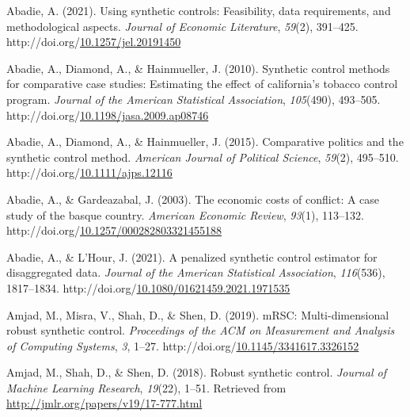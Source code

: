 \documentclass[12pt,nobind, a4paper]{reedthesis}
\newlength{\cslhangindent}
\newenvironment{CSLReferences}[2] %
{%
	\setlength{\parindent}{0pt}
	\ifodd #1 \everypar{\setlength{\hangindent}{\cslhangindent}}\ignorespaces\fi
	\ifnum #2 > 0
	\setlength{\parskip}{#2\baselineskip}
	\fi
}%
{}
\begin{document}
 \begin{CSLReferences}{1}{0}
 \leavevmode{}%
 Abadie, A. (2021). Using synthetic controls: Feasibility, data requirements, and methodological aspects. \emph{Journal of Economic Literature}, \emph{59}(2), 391--425. http://doi.org/\href{https://doi.org/10.1257/jel.20191450}{10.1257/jel.20191450}

 \leavevmode{}%
 Abadie, A., Diamond, A., \& Hainmueller, J. (2010). Synthetic control methods for comparative case studies: Estimating the effect of california's tobacco control program. \emph{Journal of the American Statistical Association}, \emph{105}(490), 493--505. http://doi.org/\href{https://doi.org/10.1198/jasa.2009.ap08746}{10.1198/jasa.2009.ap08746}

 \leavevmode{}%
 Abadie, A., Diamond, A., \& Hainmueller, J. (2015). Comparative politics and the synthetic control method. \emph{American Journal of Political Science}, \emph{59}(2), 495--510. http://doi.org/\href{https://doi.org/10.1111/ajps.12116}{10.1111/ajps.12116}

 \leavevmode{}%
 Abadie, A., \& Gardeazabal, J. (2003). The economic costs of conflict: A case study of the basque country. \emph{American Economic Review}, \emph{93}(1), 113--132. http://doi.org/\href{https://doi.org/10.1257/000282803321455188}{10.1257/000282803321455188}

 \leavevmode{}%
 Abadie, A., \& L'Hour, J. (2021). A penalized synthetic control estimator for disaggregated data. \emph{Journal of the American Statistical Association}, \emph{116}(536), 1817--1834. http://doi.org/\href{https://doi.org/10.1080/01621459.2021.1971535}{10.1080/01621459.2021.1971535}

 \leavevmode{}%
 Amjad, M., Misra, V., Shah, D., \& Shen, D. (2019). {mRSC}: Multi-dimensional robust synthetic control. \emph{Proceedings of the {ACM} on Measurement and Analysis of Computing Systems}, \emph{3}, 1--27. http://doi.org/\href{https://doi.org/10.1145/3341617.3326152}{10.1145/3341617.3326152}

 \leavevmode{}%
 Amjad, M., Shah, D., \& Shen, D. (2018). Robust synthetic control. \emph{Journal of Machine Learning Research}, \emph{19}(22), 1--51. Retrieved from \url{http://jmlr.org/papers/v19/17-777.html}


\end{CSLReferences}
\end{document}
